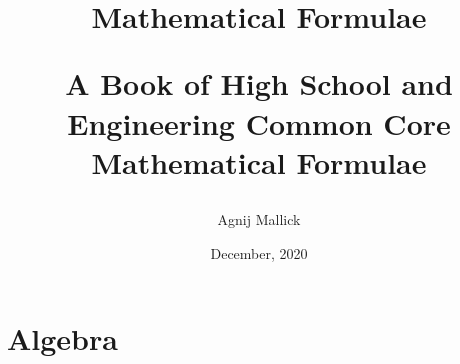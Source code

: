 \documentclass[openany, oneside]{book}
\title{Mathematical Formulae\\\begin{large}
		A Book of High School and Engineering Common Core Mathematical Formulae
\end{large}}
\date{December, 2020}
\author{Agnij Mallick}
\begin{document}
	
	\maketitle
	\tableofcontents

	\part{Algebra}
	
	
\end{document}
